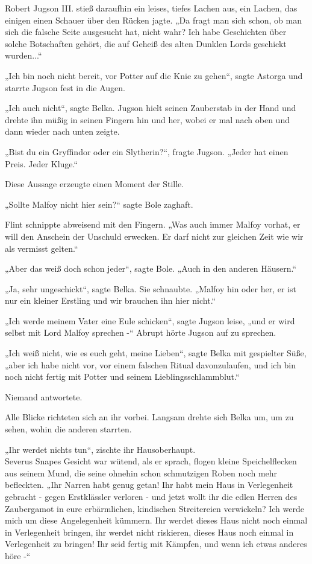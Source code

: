 {Robert Jugson III. stieß daraufhin ein leises, tiefes Lachen aus, ein Lachen, das einigen einen Schauer über den Rücken jagte. „Da fragt man sich schon, ob man sich die falsche Seite ausgesucht hat, nicht wahr? Ich habe Geschichten über solche Botschaften gehört, die auf Geheiß des alten Dunklen Lords geschickt wurden...“

„Ich bin noch nicht bereit, vor Potter auf die Knie zu gehen“, sagte Astorga und starrte Jugson fest in die Augen.

„Ich auch nicht“, sagte Belka. Jugson hielt seinen Zauberstab in der Hand und drehte ihn müßig in seinen Fingern hin und her, wobei er mal nach oben und dann wieder nach unten zeigte.

„Bist du ein Gryffindor oder ein Slytherin?“, fragte Jugson. „Jeder hat einen Preis. Jeder Kluge.“

Diese Aussage erzeugte einen Moment der Stille.

„Sollte Malfoy nicht hier sein?“ sagte Bole zaghaft.

Flint schnippte abweisend mit den Fingern. „Was auch immer Malfoy vorhat, er will den Anschein der Unschuld erwecken. Er darf nicht zur gleichen Zeit wie wir als vermisst gelten.“

„Aber das weiß doch schon jeder“, sagte Bole. „Auch in den anderen Häusern.“

„Ja, sehr ungeschickt“, sagte Belka. Sie schnaubte. „Malfoy hin oder her, er ist nur ein kleiner Erstling und wir brauchen ihn hier nicht.“

„Ich werde meinem Vater eine Eule schicken“, sagte Jugson leise, „und er wird selbst mit Lord Malfoy sprechen -“ Abrupt hörte Jugson auf zu sprechen.

„Ich weiß nicht, wie es euch geht, meine Lieben“, sagte Belka mit gespielter Süße, „aber ich habe nicht vor, vor einem falschen Ritual davonzulaufen, und ich bin noch nicht fertig mit Potter und seinem Lieblingsschlammblut.“

Niemand antwortete.

Alle Blicke richteten sich an ihr vorbei. Langsam drehte sich Belka um, um zu sehen, wohin die anderen starrten.

„Ihr werdet nichts tun“, zischte ihr Hausoberhaupt.\\ Severus Snapes Gesicht war wütend, als er sprach, flogen kleine Speichelflecken aus seinem Mund, die seine ohnehin schon schmutzigen Roben noch mehr befleckten. „Ihr Narren habt genug getan! Ihr habt mein Haus in Verlegenheit gebracht - gegen Erstklässler verloren - und jetzt wollt ihr die edlen Herren des Zaubergamot in eure erbärmlichen, kindischen Streitereien verwickeln? Ich werde mich um diese Angelegenheit kümmern. Ihr werdet dieses Haus nicht noch einmal in Verlegenheit bringen, ihr werdet nicht riskieren, dieses Haus noch einmal in Verlegenheit zu bringen! Ihr seid fertig mit Kämpfen, und wenn ich etwas anderes höre -“

}
